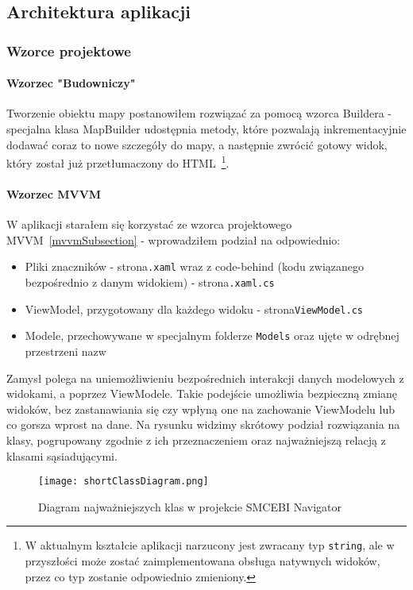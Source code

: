 \subsection{Architektura aplikacji}

\subsubsection{Wzorce projektowe}

\paragraph{Wzorzec "Budowniczy"}
Tworzenie obiektu mapy postanowiłem rozwiązać za pomocą wzorca Buildera - 
specjalna klasa MapBuilder udostępnia metody, które pozwalają inkrementacyjnie 
dodawać coraz to nowe szczegóły do mapy, a następnie zwrócić gotowy widok, 
który został już przetłumaczony do HTML~\cprotect\footnote{%
    W aktualnym kształcie aplikacji narzucony jest zwracany typ \verb|string|, 
    ale w przyszłości może zostać zaimplementowana obsługa natywnych widoków,
    przez co typ zostanie odpowiednio zmieniony.}.

\paragraph{Wzorzec MVVM}
W aplikacji starałem się korzystać ze wzorca projektowego MVVM~\ref{mvvmSubsection} - 
wprowadziłem podział na odpowiednio:
\begin{itemize}
    \item Pliki znaczników - strona\verb|.xaml| wraz z code-behind 
    (kodu związanego bezpośrednio z danym widokiem) - strona\verb|.xaml.cs|
    \item ViewModel, przygotowany dla każdego widoku - strona\verb|ViewModel.cs|
    \item Modele, przechowywane w specjalnym folderze \verb|Models| oraz ujęte w odrębnej przestrzeni nazw
\end{itemize}

Zamysł polega na uniemożliwieniu bezpośrednich interakcji danych 
modelowych z widokami, a poprzez ViewModele. Takie podejście umożliwia bezpieczną zmianę 
widoków, bez zastanawiania się czy wpłyną one na zachowanie ViewModelu lub co gorsza wprost na dane.
Na rysunku  widzimy skrótowy podział rozwiązania na klasy, pogrupowany 
zgodnie z ich przeznaczeniem oraz najważniejszą relacją z klasami sąsiadującymi.
\begin{figure}[ht]
    \centering
    \texttt{[image: shortClassDiagram.png]}
    \caption{Diagram najważniejszych klas w projekcie SMCEBI Navigator}
    \label{img:shortClassDiagram}
\end{figure}
\newpage
